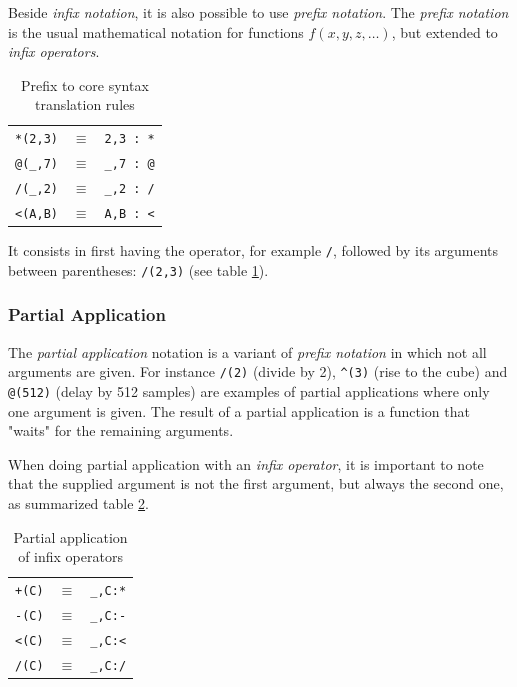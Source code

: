 Beside \emph{infix notation}, it is also possible to use \emph{prefix notation}. 
The \emph{prefix notation} is the usual mathematical notation for functions $f(x,y,z,\ldots)$, but extended to \emph{infix operators}. 
%
\begin{table}[h!]
	\begin{center}
	\begin{tabular}{|rcl|}
	\hline
	\lstinline'*(2,3)' & $\equiv$ & \lstinline'2,3 : *'\\
	\lstinline'@(_,7)' & $\equiv$ & \lstinline'_,7 : @'\\
	\lstinline'/(_,2)' & $\equiv$ & \lstinline'_,2 : /'\\
	\lstinline'<(A,B)' & $\equiv$ & \lstinline'A,B : <'\\
	\hline
	\end{tabular}
	\end{center}
	\caption{Prefix to core syntax translation rules}
	\label{tab-prefixrules}
\end{table}

It consists in first having the operator, for example \lstinline'/', followed by its arguments between parentheses: \lstinline'/(2,3)' (see table \ref{tab-prefixrules}). 

\subsubsection{Partial Application}

The \emph{partial application} notation is a variant of \emph{prefix notation} in which not all arguments are given. For instance  \lstinline'/(2)' (divide by 2), \lstinline'^(3)'  (rise to the cube) and \lstinline'@(512)' (delay by 512 samples) are examples of partial applications where only one argument is given. The result of a partial application is a function that "waits" for the remaining arguments. 

When doing partial application with an \emph{infix operator}, it is important to note that the supplied argument is not the first argument, but always the second one, as summarized table \ref{tab-partialrules}. 


\begin{table}[h]
	\begin{center}
	\begin{tabular}{|rcl|}
	\hline
	\lstinline'+(C)' & $\equiv$ & \lstinline'_,C:*'\\
	\lstinline'-(C)' & $\equiv$ & \lstinline'_,C:-'\\
	\lstinline'<(C)' & $\equiv$ & \lstinline'_,C:<'\\
	\lstinline'/(C)' & $\equiv$ & \lstinline'_,C:/'\\
	\hline
	\end{tabular}
	\end{center}
	\caption{Partial application of infix operators}
	\label{tab-partialrules}
\end{table}

